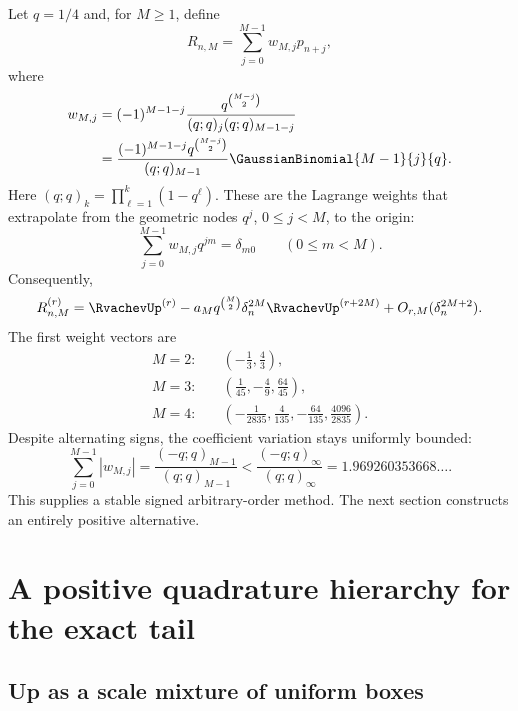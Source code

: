 \documentclass[11pt,oneside]{article}
\numberwithin{equation}{section}
\theoremstyle{definition}
\theoremstyle{remark}
\begin{document}
Let $q=1/4$ and, for $M\ge1$, define
\begin{equation}
 R_{n,M}=\sum_{j=0}^{M-1}w_{M,j}p_{n+j},
 \label{p3:eq:richardson-combination}
\end{equation}
where
\begin{equation}
\begin{aligned}
 w_{M,j}
 &=(-1)^{M-1-j}
 \frac{q^{\binom{M-j}{2}}}{(q;q)_j(q;q)_{M-1-j}}\\
 &=\frac{(-1)^{M-1-j}q^{\binom{M-j}{2}}}{(q;q)_{M-1}}
 \GaussianBinomial{M-1}{j}{q}.
\end{aligned}
 \label{p3:eq:richardson-weights}
\end{equation}
Here $(q;q)_k=\prod_{\ell=1}^k(1-q^\ell)$.  These are the Lagrange weights that
extrapolate from the geometric nodes $q^j$, $0\le j<M$, to the origin:
\begin{equation}
 \sum_{j=0}^{M-1}w_{M,j}q^{jm}=\delta_{m0}
 \qquad(0\le m<M).
 \label{p3:eq:richardson-moments}
\end{equation}
Consequently,
\begin{equation}
 R_{n,M}^{(r)}
 =\RvachevUp^{(r)}-a_Mq^{\binom M2}\delta_n^{2M}\RvachevUp^{(r+2M)}
 +O_{r,M}(\delta_n^{2M+2}).
 \label{p3:eq:richardson-leading}
\end{equation}
The first weight vectors are
\begin{align*}
 M=2:&\quad\left(-\frac13,\frac43\right),\\
 M=3:&\quad\left(\frac1{45},-\frac49,\frac{64}{45}\right),\\
 M=4:&\quad\left(-\frac1{2835},\frac4{135},-\frac{64}{135},\frac{4096}{2835}\right).
\end{align*}
Despite alternating signs, the coefficient variation stays uniformly bounded:
\begin{equation}
 \sum_{j=0}^{M-1}|w_{M,j}|
 =\frac{(-q;q)_{M-1}}{(q;q)_{M-1}}
 <\frac{(-q;q)_\infty}{(q;q)_\infty}
 =1.969260353668\ldots.
 \label{p3:eq:richardson-stability}
\end{equation}
This supplies a stable signed arbitrary-order method.  The next section constructs an
entirely positive alternative.

\section{A positive quadrature hierarchy for the exact tail}
\label{p3:sec:positive}

\subsection{Up as a scale mixture of uniform boxes}
\end{document}
